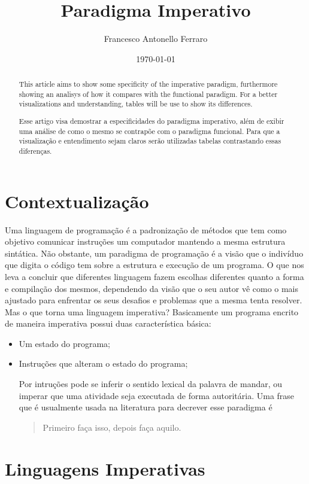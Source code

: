 \documentclass[11pt]{article}
\author{Francesco Antonello Ferraro}
\date{\today}
\title{Paradigma Imperativo}
\begin{document}
\maketitle
{}
\begin{abstract}
This article aims to show some specificity of the imperative paradigm, furthermore showing an analisys of how it compares
with the functional paradigm. For a better visualizations and understanding, tables will be use to show its differences.
\end{abstract}
\begin{abstract}
Esse artigo visa demostrar a especificidades do paradigma imperativo, além de exibir uma análise de como o mesmo se contrapõe com o paradigma funcional. Para que a visualização e entendimento sejam claros serão utilizadas tabelas contrastando essas diferenças.
\end{abstract}



\section{Contextualização}
\label{sec:org9d1b70b}

Uma linguagem de programação é a padronização de métodos que tem como objetivo comunicar instruções um computador mantendo a mesma estrutura sintática. Não obstante, um paradigma de programação é a visão que o indivíduo que digita o código tem sobre a estrutura e execução de um programa. O que nos leva a concluir que diferentes linguagem fazem escolhas diferentes quanto a forma e compilação dos mesmos, dependendo da visão que o seu autor vê como o mais ajustado para enfrentar os seus desafios e problemas que a mesma tenta resolver.
Mas o que torna uma linguagem imperativa? Basicamente um programa encrito de maneira imperativa possui duas característica básica:

\begin{itemize}
\item Um estado do programa;
\item Instruções que alteram o estado do programa;

Por intruções pode se inferir o sentido lexical da palavra de mandar, ou imperar que uma atividade seja executada de forma autoritária. Uma frase que é usualmente  usada na literatura para decrever esse paradigma é

\begin{quote}
Primeiro faça isso, depois faça aquilo.
\end{quote}
\end{itemize}
\section{Linguagens Imperativas}
\label{sec:org6590f4c}
\end{document}
